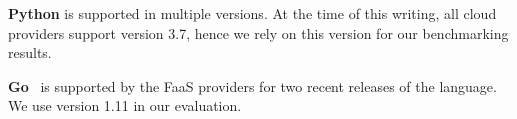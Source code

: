 
\textbf{Python} is supported in multiple versions. %
At the time of this writing, all cloud providers support version 3.7, hence we rely on this version for our benchmarking results.



\textbf{Go}~\cite{GoProject,GoProject} is supported by the FaaS providers for two recent releases of the language.
We use version 1.11 in our evaluation.

